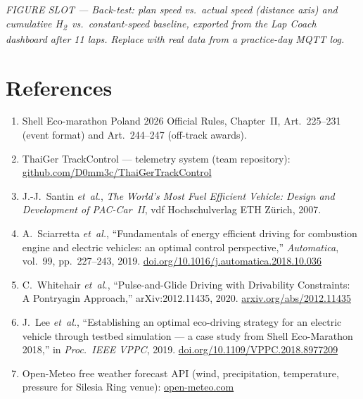 \documentclass[11pt,a4paper]{article}
\newcommand{\tenpt}{\fontsize{10}{12}\selectfont}
\newcommand{\hyd}{H\textsubscript{2}}
\newcommand{\figslot}[2]{\begin{tcolorbox}[enhanced,sharp corners,colback=fog,
  boxrule=0pt,frame hidden,height=#1,halign=center,valign=center,
  borderline={0.6pt}{0pt}{mist,dashed}]%
  {\tenpt\color{graphite}\itshape FIGURE SLOT — #2}\end{tcolorbox}}
\begin{document}
\figslot{28mm}{Back-test: plan speed vs.\ actual speed (distance axis) and cumulative
\hyd\ vs.\ constant-speed baseline, exported from the Lap Coach dashboard after 11 laps.
\textit{Replace with real data from a practice-day MQTT log.}}

\section*{References}
\begin{enumerate}[leftmargin=1.5em,itemsep=1pt,topsep=3pt]
\item Shell Eco-marathon Poland 2026 Official Rules, Chapter~II,
  Art.~225--231 (event format) and Art.~244--247 (off-track awards).
\item ThaiGer TrackControl — telemetry system (team repository):\\
  \url{github.com/D0mm3c/ThaiGerTrackControl}
\item J.-J.~Santin \emph{et~al.}, \emph{The World's Most Fuel Efficient
  Vehicle: Design and Development of PAC-Car~II},
  vdf Hochschulverlag ETH Zürich, 2007.
\item A.~Sciarretta \emph{et~al.}, ``Fundamentals of energy efficient driving
  for combustion engine and electric vehicles: an optimal control
  perspective,'' \emph{Automatica}, vol.~99, pp.~227--243, 2019.
  \url{doi.org/10.1016/j.automatica.2018.10.036}
\item C.~Whitehair \emph{et~al.}, ``Pulse-and-Glide Driving with
  Drivability Constraints: A Pontryagin Approach,''
  arXiv:2012.11435, 2020.
  \url{arxiv.org/abs/2012.11435}
\item J.~Lee \emph{et~al.}, ``Establishing an optimal eco-driving strategy for
  an electric vehicle through testbed simulation — a case study from
  Shell Eco-Marathon 2018,'' in \emph{Proc.\ IEEE VPPC}, 2019.
  \url{doi.org/10.1109/VPPC.2018.8977209}
\item Open-Meteo free weather forecast API (wind, precipitation,
  temperature, pressure for Silesia Ring venue):
  \url{open-meteo.com}
\end{enumerate}
\end{document}
